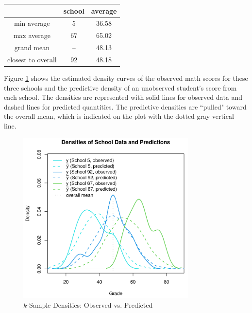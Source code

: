 \documentclass[12pt, a4paper]{article}
\begin{document}
\begin{center}
  \begin{tabular}{|c|c|c|}
    \hline
    & school & average \\
    \hline
    min average & 5 & 36.58 \\
    \hline
    max average & 67 & 65.02 \\
    \hline
    grand mean & -- & 48.13 \\
    \hline
    closest to overall & 92 & 48.18\\
    \hline
  \end{tabular}
\end{center}

\clearpage

\noindent Figure \ref{fig:NormIGk_DvP} shows the estimated density curves of the observed math scores for these three schools and the predictive density of an unobserved student's score from each school.  The densities are represented with solid lines for observed data and dashed lines for predicted quantities.  The predictive densities are ``pulled" toward the overall mean, which is indicated on the plot with the dotted gray vertical line.

\begin{figure}[h]
  \centering
  \includegraphics[width=0.8\textwidth]{./Graphics/ExamplePlots/NormIGk_Data_v_Prediction}
  \caption{$k$-Sample Densities: Observed vs. Predicted}
  \label{fig:NormIGk_DvP}
\end{figure}



\end{document}
